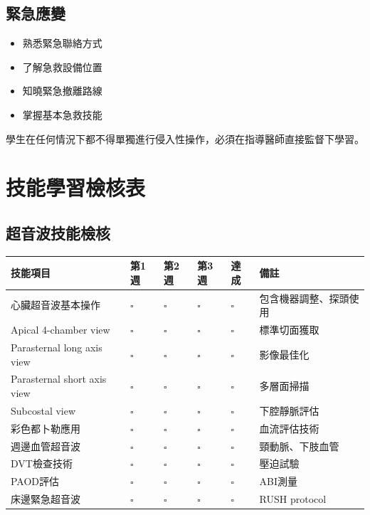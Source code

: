 \documentclass[12pt,a4paper]{article}
\newcommand{\note}[1]{
    \par
    \noindent
    \begin{tcolorbox}[
        colback=emergency_blue!5!white,
        colframe=emergency_blue,
        title=\textbf{重點提醒},
        fonttitle=\bfseries,
        boxrule=0.5pt,
        arc=3pt,
        left=6pt,
        right=6pt,
        top=6pt,
        bottom=6pt
    ]
    #1
    \end{tcolorbox}
}
\begin{document}
\subsection{緊急應變}
\begin{itemize}[nosep]
    \item 熟悉緊急聯絡方式
    \item 了解急救設備位置
    \item 知曉緊急撤離路線
    \item 掌握基本急救技能
\end{itemize}

\vspace{0.5cm}
\note{
學生在任何情況下都不得單獨進行侵入性操作，必須在指導醫師直接監督下學習。
}

\section{技能學習檢核表}

\subsection{超音波技能檢核}

\begin{longtable}{|>{\raggedright\arraybackslash}p{3.5cm}|>{\raggedright\arraybackslash}p{1.5cm}|>{\raggedright\arraybackslash}p{1.5cm}|>{\raggedright\arraybackslash}p{1.5cm}|>{\raggedright\arraybackslash}p{1.5cm}|>{\raggedright\arraybackslash}p{4cm}|}
\hline
\rowcolor{light_blue}
\textbf{技能項目} & \textbf{第1週} & \textbf{第2週} & \textbf{第3週} & \textbf{達成} & \textbf{備註} \\
\hline
心臟超音波基本操作 & $\square$ & $\square$ & $\square$ & $\square$ & 包含機器調整、探頭使用 \\
\hline
Apical 4-chamber view & $\square$ & $\square$ & $\square$ & $\square$ & 標準切面獲取 \\
\hline
Parasternal long axis view & $\square$ & $\square$ & $\square$ & $\square$ & 影像最佳化 \\
\hline
Parasternal short axis view & $\square$ & $\square$ & $\square$ & $\square$ & 多層面掃描 \\
\hline
Subcostal view & $\square$ & $\square$ & $\square$ & $\square$ & 下腔靜脈評估 \\
\hline
彩色都卜勒應用 & $\square$ & $\square$ & $\square$ & $\square$ & 血流評估技術 \\
\hline
週邊血管超音波 & $\square$ & $\square$ & $\square$ & $\square$ & 頸動脈、下肢血管 \\
\hline
DVT檢查技術 & $\square$ & $\square$ & $\square$ & $\square$ & 壓迫試驗 \\
\hline
PAOD評估 & $\square$ & $\square$ & $\square$ & $\square$ & ABI測量 \\
\hline
床邊緊急超音波 & $\square$ & $\square$ & $\square$ & $\square$ & RUSH protocol \\
\hline
\end{longtable}
\end{document}
